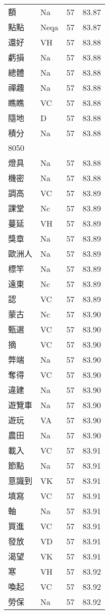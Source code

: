 \documentclass[twocolumn]{book}
\begin{document}
\begin{supertabular}{llrr}
額 & Na & 57 &  83.87\\
點點 & Neqa & 57 &  83.87\\
還好 & VH & 57 &  83.88\\
虧損 & Na & 57 &  83.88\\
總體 & Na & 57 &  83.88\\
禪趣 & Na & 57 &  83.88\\
瞧瞧 & VC & 57 &  83.88\\
隨地 & D & 57 &  83.88\\
積分 & Na & 57 &  83.88\\
8050\\
燈具 & Na & 57 &  83.88\\
機密 & Na & 57 &  83.88\\
調高 & VC & 57 &  83.89\\
課堂 & Nc & 57 &  83.89\\
蔓延 & VH & 57 &  83.89\\
獎章 & Na & 57 &  83.89\\
歐洲人 & Na & 57 &  83.89\\
標竿 & Na & 57 &  83.89\\
遠東 & Nc & 57 &  83.89\\
認 & VC & 57 &  83.89\\
蒙古 & Nc & 57 &  83.90\\
甄選 & VC & 57 &  83.90\\
摘 & VC & 57 &  83.90\\
弊端 & Na & 57 &  83.90\\
奪得 & VC & 57 &  83.90\\
違建 & Na & 57 &  83.90\\
遊覽車 & Na & 57 &  83.90\\
遊玩 & VA & 57 &  83.90\\
農田 & Na & 57 &  83.90\\
載入 & VC & 57 &  83.91\\
節點 & Na & 57 &  83.91\\
意識到 & VK & 57 &  83.91\\
填寫 & VC & 57 &  83.91\\
軸 & Na & 57 &  83.91\\
買進 & VC & 57 &  83.91\\
發放 & VD & 57 &  83.91\\
渴望 & VK & 57 &  83.91\\
寒 & VH & 57 &  83.92\\
喚起 & VC & 57 &  83.92\\
勞保 & Na & 57 &  83.92\\

\end{supertabular}
\end{document}
